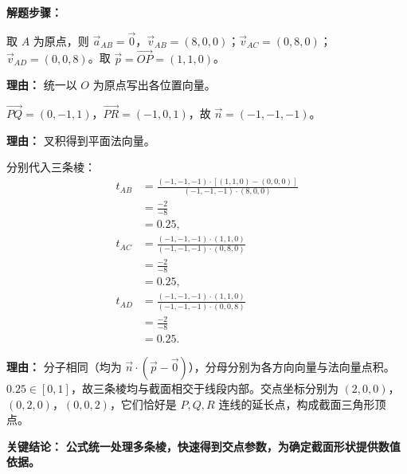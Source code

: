 \begin{examplebox}
	\medskip
	\textbf{\textcolor{CExample}{解题步骤：}}
	\begin{description}[style=nextline, leftmargin=2.8em, labelsep=0.5em, itemsep=0.45em]
		\item[\textbf{第一步（确定坐标向量）：}]
			取 $A$ 为原点，则 $\vec{a}_{AB}=\vec{0}$，$\vec{v}_{AB}=(8,0,0)$；$\vec{v}_{AC}=(0,8,0)$；$\vec{v}_{AD}=(0,0,8)$。取 $\vec{p}=\overrightarrow{OP}=(1,1,0)$。
			\par\textbf{理由：} 统一以 $O$ 为原点写出各位置向量。
		\item[\textbf{第二步（法向量计算）：}]
			$\overrightarrow{PQ}=(0,-1,1)$，$\overrightarrow{PR}=(-1,0,1)$，故 $\vec{n}=(-1,-1,-1)$。
			\par\textbf{理由：} 叉积得到平面法向量。
		\item[\textbf{第三步（替代公式求 $t$）：}]
			分别代入三条棱：
			\[
				\begin{aligned}
					t_{AB} &= \frac{(-1,-1,-1)\cdot[(1,1,0)-(0,0,0)]}{(-1,-1,-1)\cdot(8,0,0)} \\ &= \frac{-2}{-8} \\ &= 0.25,\\ t_{AC} &= \frac{(-1,-1,-1)\cdot(1,1,0)}{(-1,-1,-1)\cdot(0,8,0)} \\ &= \frac{-2}{-8} \\ &= 0.25,\\ t_{AD} &= \frac{(-1,-1,-1)\cdot(1,1,0)}{(-1,-1,-1)\cdot(0,0,8)} \\ &= \frac{-2}{-8} \\ &= 0.25.
			\end{aligned}
			\]
			\par\textbf{理由：} 分子相同（均为 $\vec{n}\cdot(\vec{p}-\vec{0})$），分母分别为各方向向量与法向量点积。$0.25\in[0,1]$，故三条棱均与截面相交于线段内部。交点坐标分别为 $(2,0,0)$，$(0,2,0)$，$(0,0,2)$，它们恰好是 $P,Q,R$ 连线的延长点，构成截面三角形顶点。
	\end{description}

	\medskip
	\textbf{\textcolor{CExample}{关键结论：}}
	\textbf{公式统一处理多条棱，快速得到交点参数，为确定截面形状提供数值依据。}
\end{examplebox}
